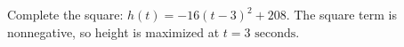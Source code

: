 Complete the square: $h(t)=-16(t-3)^2+208$. The square term is nonnegative, so height is maximized at $\boxed{t=3\text{ seconds}}$.
